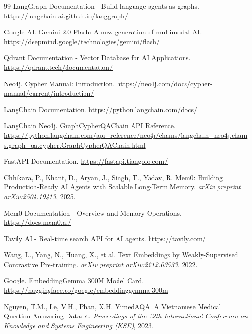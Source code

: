 \newpage
\renewcommand{\bibname}{REFERENCE}
    \begin{thebibliography}{99}
         LangGraph Documentation - Build language agents as graphs. \url{https://langchain-ai.github.io/langgraph/}
        
         Google AI. Gemini 2.0 Flash: A new generation of multimodal AI. \url{https://deepmind.google/technologies/gemini/flash/}
        
         Qdrant Documentation - Vector Database for AI Applications. \url{https://qdrant.tech/documentation/}

         Neo4j. Cypher Manual: Introduction. \url{https://neo4j.com/docs/cypher-manual/current/introduction/}

         LangChain Documentation. \url{https://python.langchain.com/docs/}

         LangChain Neo4j. GraphCypherQAChain API Reference. \url{https://python.langchain.com/api_reference/neo4j/chains/langchain_neo4j.chains.graph_qa.cypher.GraphCypherQAChain.html}

         FastAPI Documentation. \url{https://fastapi.tiangolo.com/}

         Chhikara, P., Khant, D., Aryan, J., Singh, T., Yadav, R. Mem0: Building Production-Ready AI Agents with Scalable Long-Term Memory. \textit{arXiv preprint arXiv:2504.19413}, 2025.

         Mem0 Documentation - Overview and Memory Operations. \url{https://docs.mem0.ai/}
        
         Tavily AI - Real-time search API for AI agents. \url{https://tavily.com/}
        
         Wang, L., Yang, N., Huang, X., et al. Text Embeddings by Weakly-Supervised Contrastive Pre-training. \textit{arXiv preprint arXiv:2212.03533}, 2022.

         Google. EmbeddingGemma 300M Model Card. \url{https://huggingface.co/google/embeddinggemma-300m}
        
         Nguyen, T.M., Le, V.H., Phan, X.H. VimedAQA: A Vietnamese Medical Question Answering Dataset. \textit{Proceedings of the 12th International Conference on Knowledge and Systems Engineering (KSE)}, 2023.
                

\end{thebibliography}
